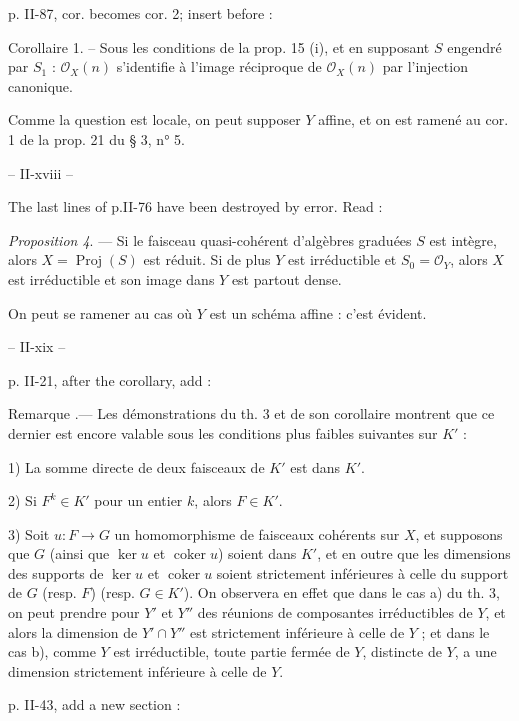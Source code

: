 \noindent p. II-87, cor. becomes cor. 2; insert before :

\noindent Corollaire 1. -- Sous les conditions de la prop. 15 (i), et en supposant $S$ engendré par $S_1$ : $\mathcal{O}_X(n)$ s'identifie à l'image réciproque de $\mathcal{O}_X(n)$ par l'injection canonique.

\noindent Comme la question est locale, on peut supposer $Y$ affine, et
on est ramené au cor. 1 de la prop. 21 du § 3, n° 5.

\newpage


-- II-xviii --

The last lines of p.II-76 have been destroyed by error. Read :

\emph{Proposition 4}. — Si le faisceau quasi-cohérent d'algèbres graduées $S$ est intègre, alors $X = \operatorname{Proj}(S)$ est réduit. Si de plus $Y$ est irréductible et $S_0 = \mathcal{O}_Y$, alors $X$ est irréductible et son image dans $Y$ est partout dense.

On peut se ramener au cas où $Y$ est un schéma affine : c'est évident.

\newpage


-- II-xix --

p. II-21, after the corollary, add :

Remarque .— Les démonstrations du th. 3 et de son corollaire montrent que ce dernier est encore valable sous les conditions plus faibles suivantes sur $K'$ :

1) La somme directe de deux faisceaux de $K'$ est dans $K'$.

2) Si $F^k \in K'$ pour un entier $k$, alors $F \in K'$.

3) Soit $u : F \to G$ un homomorphisme de faisceaux cohérents sur $X$, et supposons que $G$ (ainsi que $\ker u$ et $\operatorname{coker} u$) soient dans $K'$, et en outre que les dimensions des supports de $\ker u$ et $\operatorname{coker} u$ soient strictement inférieures à celle du support de $G$ (resp. $F$) (resp. $G \in K'$). On observera en effet que dans le cas a) du th. 3, on peut prendre pour $Y'$ et $Y''$ des réunions de composantes irréductibles de $Y$, et alors la dimension de $Y' \cap Y''$ est strictement inférieure à celle de $Y$ ; et dans le cas b), comme $Y$ est irréductible, toute partie fermée de $Y$, distincte de $Y$, a une dimension strictement inférieure à celle de $Y$.

p. II-43, add a new section :

